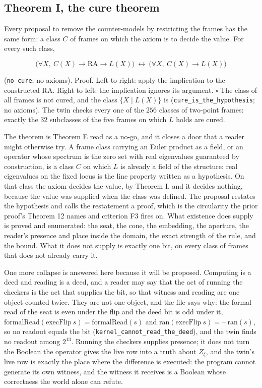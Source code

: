 \documentclass[10pt]{article}
\begin{document}
\hypertarget{theorem-i-the-cure-theorem}{%
\subsection{Theorem I, the cure
theorem}\label{theorem-i-the-cure-theorem}}

Every proposal to remove the counter-models by restricting the frames
has the same form: a class \(C\) of frames on which the axiom is to
decide the value. For every such class,

\[\big(\forall X,\ C(X) \to \mathrm{RA} \to L(X)\big) \ \leftrightarrow\ \big(\forall X,\ C(X) \to L(X)\big)\]

(\texttt{no\_\allowbreak cure}; no axioms). Proof. Left to right: apply
the implication to the constructed \(\mathrm{RA}\). Right to left: the
implication ignores its argument. \(\square\) The class of all frames is
not cured, and the class \(\{X \mid L(X)\}\) is
(\texttt{cure\_\allowbreak is\_\allowbreak the\_\allowbreak hypothesis};
no axioms). The twin checks every one of the \(256\) classes of
two-point frames: exactly the \(32\) subclasses of the five frames on
which \(L\) holds are cured.

The theorem is Theorem E read as a no-go, and it closes a door that a
reader might otherwise try. A frame class carrying an Euler product as a
field, or an operator whose spectrum is the zero set with real
eigenvalues guaranteed by construction, is a class \(C\) on which \(L\)
is already a field of the structure: real eigenvalues on the fixed locus
is the line property written as a hypothesis. On that class the axiom
decides the value, by Theorem I, and it decides nothing, because the
value was supplied when the class was defined. The proposal restates the
hypothesis and calls the restatement a proof, which is the circularity
the prior proof's Theorem 12 names and criterion F3 fires on. What
existence does supply is proved and enumerated: the seat, the cone, the
embedding, the aperture, the reader's presence and place inside the
domain, the exact strength of the rule, and the bound. What it does not
supply is exactly one bit, on every class of frames that does not
already carry it.

One more collapse is answered here because it will be proposed.
Computing is a deed and reading is a deed, and a reader may say that the
act of running the checkers is the act that supplies the bit, so that
witness and reading are one object counted twice. They are not one
object, and the file says why: the formal read of the seat is even under
the flip and the deed bit is odd under it,
\(\mathrm{formalRead}(\mathrm{execFlip}\ s) = \mathrm{formalRead}(s)\)
and \(\mathrm{ran}(\mathrm{execFlip}\ s) = \neg\,\mathrm{ran}(s)\), so
no readout equals the bit
(\texttt{kernel\_\allowbreak cannot\_\allowbreak read\_\allowbreak the\_\allowbreak deed}),
and the twin finds no readout among \(2^{13}\). Running the checkers
supplies presence; it does not turn the Boolean the operator gives the
live row into a truth about \(Z_\xi\), and the twin's live row is
exactly the place where the difference is executed: the program cannot
generate its own witness, and the witness it receives is a Boolean whose
correctness the world alone can refute.
\end{document}
